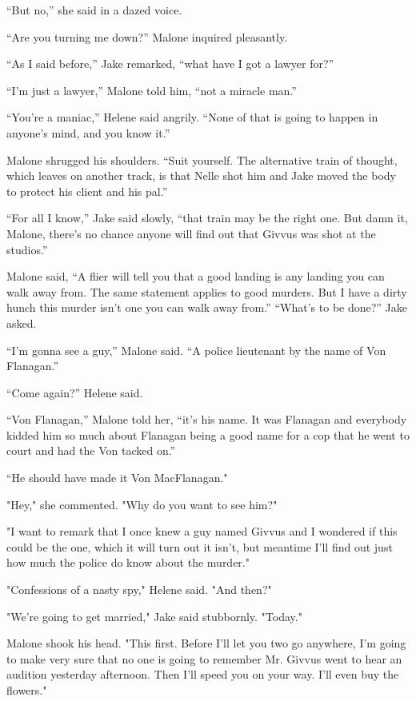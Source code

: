 \documentclass{novel}
\begin{document}
“But no,” she said in a dazed voice.

“Are you turning me down?” Malone inquired pleasantly.

“As I said before,” Jake remarked, “what have I got a lawyer for?”

“I’m just a lawyer,” Malone told him, “not a miracle man.”

“You’re a maniac,” Helene said angrily. “None of that is going to happen in anyone’s mind, and you know it.”

Malone shrugged his shoulders. “Suit yourself. The alternative train of thought, which leaves on another track, is that Nelle shot him and Jake moved the body to protect his client and his pal.”

“For all I know,” Jake said slowly, “that train may be the right one. But damn it, Malone, there’s no chance anyone will find out that Givvus was shot at the studios.”

Malone said, “A flier will tell you that a good landing is any landing you can walk away from. The same statement applies to good murders. But I have a dirty hunch this murder isn’t one you can walk away from.” “What’s to be done?” Jake asked.

“I’m gonna see a guy,” Malone said. “A police lieutenant by the name of Von Flanagan.”

“Come again?” Helene said.

“Von Flanagan,” Malone told her, “it’s his name. It was Flanagan and everybody kidded him so much about Flanagan being a good name for a cop that he went to court and had the Von tacked on.”

“He should have made it Von MacFlanagan."

"Hey," she commented. "Why do you want to see him?"

"I want to remark that I once knew a guy named Givvus and I wondered if this could be the one, which it will turn out it isn't, but meantime I'll find out just how much the police do know about the murder."

"Confessions of a nasty spy," Helene said. "And then?"

"We're going to get married," Jake said stubbornly. "Today."

Malone shook his head. "This first. Before I'll let you two go anywhere, I'm going to make very sure that no one is going to remember Mr. Givvus went to hear an audition yesterday afternoon. Then I'll speed you on your way. I'll even buy the flowers."
\end{document}
